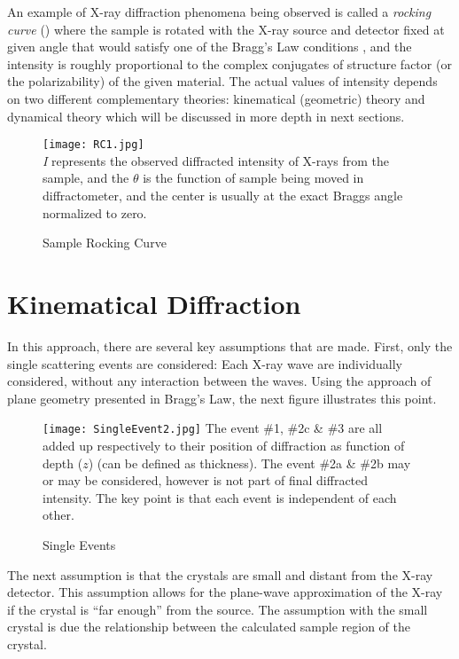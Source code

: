 An example of X-ray diffraction phenomena being observed is called a \emph{rocking curve} () where the sample is rotated with the X-ray source and detector fixed at given angle that would satisfy one of the Bragg's Law conditions , and the intensity is roughly proportional to the complex conjugates of structure factor (or the polarizability) of the given material.  The actual values of intensity depends on two different complementary theories:  kinematical (geometric) theory and dynamical theory which will be discussed in more depth in next sections.

\begin{figure}[h]
\centering
\caption{Sample Rocking Curve}
\label{RC1}
\texttt{[image: RC1.jpg]}\\
\emph{I} represents the observed diffracted intensity of X-rays from the sample, and the $\theta$ is the function of sample being moved in diffractometer, and the center is usually at the exact Braggs angle normalized to zero.
\end{figure}




	\section{Kinematical Diffraction}

In this approach, there are several key assumptions that are made.  First, only the single scattering events are considered:  Each X-ray wave are individually considered, without any interaction between the waves.   Using the approach of plane geometry presented in Bragg's Law, the next figure  illustrates this point.

\begin{figure}[h]
\caption{Single Events}
\label{SingleEvent}
\texttt{[image: SingleEvent2.jpg]}
The event \#1, \#2c \& \#3 are all added up respectively to their position of diffraction as function of depth ($z$) (can be defined as thickness).  The event \#2a \& \#2b may or may be considered, however is not part of final diffracted intensity.  The key point is that each event is independent of each other.
\end{figure}

The next assumption is that the crystals are small and distant from the X-ray detector.    This assumption allows for the plane-wave approximation of the X-ray if the crystal is ``far enough'' from the source.  The assumption with the small crystal is due the relationship between the calculated sample region of the crystal.

